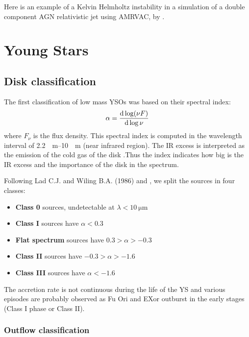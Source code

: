\documentclass[10pt,a4paper,english]{article}
\begin{document}

Here is an example of a Kelvin Helmholtz instability in a simulation of a double component AGN relativistic jet using AMRVAC, by \cite{2009ApJ...705.1594M}.


\section{Young Stars}

\subsection{Disk classification}
The first classification of low mass YSOs was based on their spectral index:
\begin{equation}
    \alpha = \frac{\mathrm{d} \log (\nu F)}{\mathrm{d} \log \nu}
\end{equation}
where $F_\nu$ is the flux density.
This spectral index is computed in the wavelength interval of \SIrange{2.2}{10}{\mu\m} (near infrared region). The IR excess is interpreted as the emission of the cold gas of the disk .Thus the index indicates how big is the IR excess and the importance of the disk in the spectrum.


Following Lad C.J. and Wiling B.A. (1986) and \cite{1993ApJ...406..122A}, we split the sources in four classes:
\begin{itemize}
    \item \textbf{Class 0} sources, undetectable at $\lambda < \SI{10}{\micro\m}$
    \item \textbf{Class I} sources have $\alpha < 0.3$
    \item \textbf{Flat spectrum} sources have $0.3 > \alpha > -0.3$
    \item \textbf{Class II} sources have $-0.3 > \alpha > -1.6$
    \item \textbf{Class III} sources have $\alpha < -1.6$
\end{itemize}

The accretion rate is not continuous during the life of the YS and various episodes are probably observed as Fu Ori and EXor outburst in the early stages (Class I phase or Class II).


\subsubsection{Outflow classification}
\end{document}
